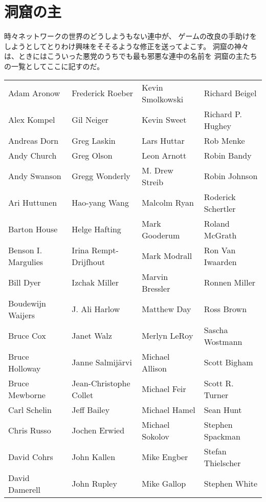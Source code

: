 \section*{洞窟の主}
\nd 時々ネットワークの世界のどうしようもない連中が、
ゲームの改良の手助けをしようとしてとりわけ興味をそそるような修正を送ってよこす。
洞窟の神々は、ときにはこういった悪党のうちでも最も邪悪な連中の名前を
洞窟の主たちの一覧としてここに記すのだ。
\begin{center}
\begin{tabular}{llll}
Adam Aronow & Frederick Roeber & Kevin Smolkowski & Richard Beigel\\
Alex Kompel & Gil Neiger & Kevin Sweet & Richard P. Hughey\\
Andreas Dorn & Greg Laskin & Lars Huttar & Rob Menke\\
Andy Church & Greg Olson & Leon Arnott & Robin Bandy\\
Andy Swanson & Gregg Wonderly & M. Drew Streib & Robin Johnson\\
Ari Huttunen & Hao-yang Wang & Malcolm Ryan & Roderick Schertler\\
Barton House & Helge Hafting & Mark Gooderum & Roland McGrath\\
Benson I. Margulies & Irina Rempt-Drijfhout & Mark Modrall & Ron Van Iwaarden\\
Bill Dyer & Izchak Miller & Marvin Bressler & Ronnen Miller\\
Boudewijn Waijers & J. Ali Harlow & Matthew Day & Ross Brown\\
Bruce Cox & Janet Walz & Merlyn LeRoy & Sascha Wostmann\\
Bruce Holloway & Janne Salmij\"{a}rvi & Michael Allison & Scott Bigham\\
Bruce Mewborne & Jean-Christophe Collet & Michael Feir & Scott R. Turner\\
Carl Schelin & Jeff Bailey & Michael Hamel & Sean Hunt\\
Chris Russo & Jochen Erwied & Michael Sokolov & Stephen Spackman\\
David Cohrs & John Kallen & Mike Engber & Stefan Thielscher\\
David Damerell & John Rupley & Mike Gallop & Stephen White\\

\end{tabular}
\end{center}
